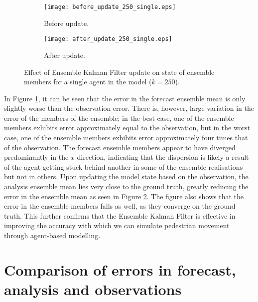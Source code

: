 \begin{figure}[h]
    \centering
    \begin{subfigure}[h]{\textwidth}
        \texttt{[image: before\_update\_250\_single.eps]}
        \caption{Before update.}\label{fig:abm_before_single}
    \end{subfigure}

    \begin{subfigure}[h]{\textwidth}
        \texttt{[image: after\_update\_250\_single.eps]}
        \caption{After update.}\label{fig:abm_after_single}
    \end{subfigure}
    \caption[Effect of Ensemble Kalman Filter update on state of a single agent
    in the model.]{\centering Effect of Ensemble Kalman Filter update on state
    of ensemble members for a single agent in the model
    ($k=250$).}\label{fig:enkf_abm_single}
\end{figure}

In Figure \ref{fig:abm_before_single}, it can be seen that the error in the
forecast ensemble mean is only slightly worse than the observation error.
There is, however, large variation in the error of the members of the ensemble;
in the best case, one of the ensemble members exhibits error approximately equal
to the observation, but in the worst case, one of the ensemble members exhibits
error approximately four times that of the observation.
The forecast ensemble members appear to have diverged predominantly in the
$x$-direction, indicating that the dispersion is likely a result of the agent
getting stuck behind another in some of the ensemble realisations but not in
others.
Upon updating the model state based on the observation, the analysis ensemble
mean lies very close to the ground truth, greatly reducing the error in the
ensemble mean as seen in Figure \ref{fig:abm_after_single}.
The figure also shows that the error in the ensemble members falls as well, as
they converge on the ground truth.
This further confirms that the Ensemble Kalman Filter is effective in improving
the accuracy with which we can simulate pedestrian movement through agent-based
modelling.

\section{Comparison of errors in forecast, analysis and
observations}\label{sec:results:comparison}

